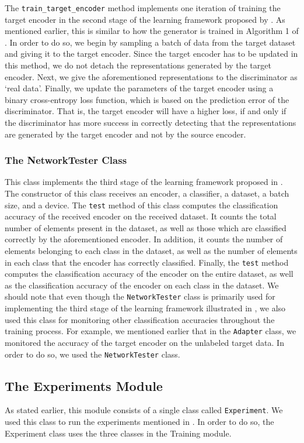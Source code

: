 \documentclass[14pt]{extarticle}
\begin{document}
		The \texttt{train\_target\_encoder} method implements one iteration of training the target encoder in the second stage of the learning framework proposed by \cite{adda}. As mentioned earlier, this is similar to how the generator is trained in Algorithm 1 of \cite{gan}. In order to do so, we begin by sampling a batch of data from the target dataset and giving it to the target encoder. Since the target encoder has to be updated in this method, we do not detach the representations generated by the target encoder. Next, we give the aforementioned representations to the discriminator as `real data'. Finally, we update the parameters of the target encoder using a binary cross-entropy loss function, which is based on the prediction error of the discriminator. That is, the target encoder will have a higher loss, if and only if the discriminator has more success in correctly detecting that the representations are generated by the target encoder and not by the source encoder.
		\subsubsection{The NetworkTester Class}
		This class implements the third stage of the learning framework proposed in \cite{adda}. The constructor of this class receives an encoder, a classifier, a dataset, a batch size, and a device. The \texttt{test} method of this class computes the classification accuracy of the received encoder on the received dataset. It counts the total number of elements present in the dataset, as well as those which are classified correctly by the aforementioned encoder. In addition, it counts the number of elements belonging to each class in the dataset, as well as the number of elements in each class that the encoder has correctly classified. Finally, the \texttt{test} method computes the classification accuracy of the encoder on the entire dataset, as well as the classification accuracy of the encoder on each class in the dataset. We should note that even though the \texttt{NetworkTester} class is primarily used for implementing the third stage of the learning framework illustrated in \cite{adda}, we  also used this class for monitoring other classification accuracies throughout the training process. For example, we mentioned earlier that in the \texttt{Adapter} class, we monitored the accuracy of the target encoder on the unlabeled target data. In order to do so, we used the \texttt{NetworkTester} class.
		\subsection{The Experiments Module}
		As stated earlier, this module consists of a single class called \texttt{Experiment}. We used this class to run the experiments mentioned in \cite{adda}. In order to do so, the Experiment class uses the three classes in the Training module.
\end{document}
